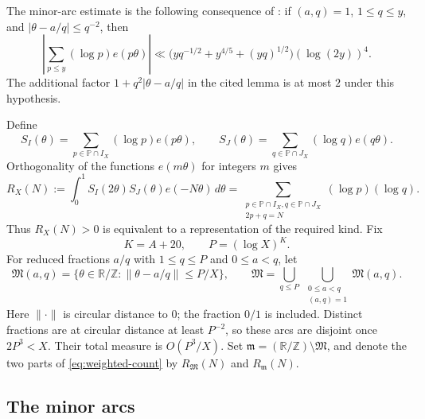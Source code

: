 \documentclass[11pt,letterpaper]{article}
\numberwithin{equation}{section}
\theoremstyle{remark}
\newcommand{\Z}{\mathbb Z}
\newcommand{\R}{\mathbb R}
\newcommand{\Pp}{\mathbb P}
\begin{document}
The minor-arc estimate is the following consequence of
\cite[Lemma~1]{Kumchev}: if $(a,q)=1$, $1\le q\le y$, and
$|\theta-a/q|\le q^{-2}$, then
\begin{equation}\label{eq:vaughan-input}
 \left|\sum_{p\le y}(\log p)e(p\theta)\right|
 \ll\bigl(yq^{-1/2}+y^{4/5}+(yq)^{1/2}\bigr)(\log(2y))^4.
\end{equation}
The additional factor $1+q^2|\theta-a/q|$ in the cited lemma is
at most $2$ under this hypothesis.

Define
\[
 S_I(\theta)=\sum_{p\in\Pp\cap I_X}(\log p)e(p\theta),\qquad
 S_J(\theta)=\sum_{q\in\Pp\cap J_X}(\log q)e(q\theta).
\]
Orthogonality of the functions $e(m\theta)$ for integers $m$ gives
\begin{equation}\label{eq:weighted-count}
 R_X(N):=\int_0^1 S_I(2\theta)S_J(\theta)e(-N\theta)\,d\theta
 =\sum_{\substack{p\in\Pp\cap I_X, q\in\Pp\cap J_X\\2p+q=N}}
       (\log p)(\log q).
\end{equation}
Thus $R_X(N)>0$ is equivalent to a representation of the required kind.
Fix
\begin{equation}\label{eq:choose-P}
 K=A+20,\qquad P=(\log X)^K.
\end{equation}
For reduced fractions $a/q$ with $1\le q\le P$ and $0\le a<q$,
let
\[
 \mathfrak M(a,q)=
 \{\theta\in\R/\Z:\|\theta-a/q\|\le P/X\},
 \qquad
 \mathfrak M=\bigcup_{q\le P}\ \bigcup_{\substack{0\le a<q\\(a,q)=1}}
                 \mathfrak M(a,q).
\]
Here $\|\cdot\|$ is circular distance to $0$; the fraction $0/1$
is included. Distinct fractions are at circular distance at least
$P^{-2}$, so these arcs are disjoint once $2P^3<X$.
Their total measure is $O(P^3/X)$. Set
$\mathfrak m=(\R/\Z)\setminus\mathfrak M$, and denote the two
parts of \eqref{eq:weighted-count} by $R_{\mathfrak M}(N)$ and
$R_{\mathfrak m}(N)$.

\subsection{The minor arcs}
\end{document}
